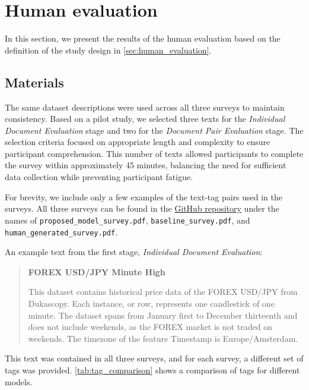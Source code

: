 \section{Human evaluation}
In this section, we present the results of the human evaluation based on the definition of the study design in \cref{sec:human_evaluation}.

\subsection{Materials}
The same dataset descriptions were used across all three surveys to maintain consistency. Based on a pilot study, we selected three texts for the \textit{Individual Document Evaluation} stage and two for the \textit{Document Pair Evaluation} stage. The selection criteria focused on appropriate length and complexity to ensure participant comprehension. This number of texts allowed participants to complete the survey within approximately 45 minutes, balancing the need for sufficient data collection while preventing participant fatigue.

For brevity, we include only a few examples of the text-tag pairs used in the surveys. All three surveys can be found in the \href{https://github.com/ivangermanov/openml-tags}{GitHub repository} \cite{germanov_topic_modeling_of_2024} under the names of \texttt{proposed\_model\_survey.pdf}, \texttt{baseline\_survey.pdf}, and \texttt{human\_generated\_survey.pdf}.

An example text from the first stage, \textit{Individual Document Evaluation}:

\begin{quote}
    \textbf{FOREX USD/JPY Minute High}

    This dataset contains historical price data of the FOREX USD/JPY from Dukascopy. Each instance, or row, represents one candlestick of one minute. The dataset spans from January first to December thirteenth and does not include weekends, as the FOREX market is not traded on weekends. The timezone of the feature Timestamp is Europe/Amsterdam.
\end{quote}

This text was contained in all three surveys, and for each survey, a different set of tags was provided. \cref{tab:tag_comparison} shows a comparison of tags for different models.

